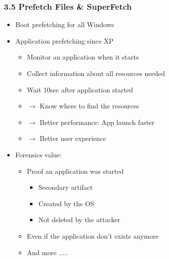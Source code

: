 \begin{frame}[fragile]
  \frametitle{3.5 Prefetch Files \& SuperFetch}
    \begin{itemize}
        \item Boot prefetching for all Windows
	\item Application prefetching since XP
        \begin{itemize}
            \item Monitor an application when it starts
            \item Collect information about all resources needed
            \item Wait 10sec after application started
	    \item[] $\to$ Know where to find the resources
            \item[] $\to$ Better performance: App launch faster
            \item[] $\to$ Better user experience
        \end{itemize}
	\item Forensics value:
        \begin{itemize}
            \item Proof an application was started
            \begin{itemize}
                \item Secondary artifact
                \item Created by the OS
                \item Not deleted by the attacker
            \end{itemize}
            \item Even if the application don't exists anymore
            \item And more .....
        \end{itemize}
    \end{itemize}
\end{frame}


